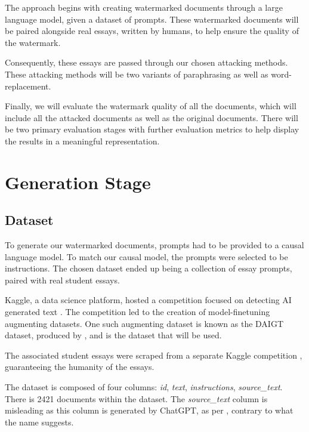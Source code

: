 \documentclass{l4proj}
\theoremstyle{definition}
\begin{document}
    The approach begins with creating watermarked documents through a large language model, given a dataset of prompts. These watermarked documents will be paired alongside real essays, written by humans, to help ensure the quality of the watermark.

    Consequently, these essays are passed through our chosen attacking methods. These attacking methods will be two variants of paraphrasing as well as word-replacement. 

    Finally, we will evaluate the watermark quality of all the documents, which will include all the attacked documents as well as the original documents. There will be two primary evaluation stages with further evaluation metrics to help display the results in a meaningful representation.

\section{Generation Stage}
    \subsection{Dataset}    
        To generate our watermarked documents, prompts had to be provided to a causal language model. To match our causal model, the prompts were selected to be instructions. The chosen dataset ended up being a collection of essay prompts, paired with real student essays. 
    
        Kaggle, a data science platform, hosted a competition focused on detecting AI generated text \citep{llm-detect-ai-generated-text}. The competition led to the creation of model-finetuning augmenting datasets. One such augmenting dataset is known as the DAIGT dataset, produced by \citet{Paullier2023-rx}, and is the dataset that will be used.

        The associated student essays were scraped from a separate Kaggle competition \citep{feedback-prize-english-language-learning}, guaranteeing the humanity of the essays.

        The dataset is composed of four columns: \emph{id}, \emph{text}, \emph{instructions}, \emph{source\_text}. There is 2421 documents within the dataset. The \emph{source\_text} column is misleading as this column is generated by ChatGPT, as per \citet{Paullier2023-rx}, contrary to what the name suggests. 
\end{document}
